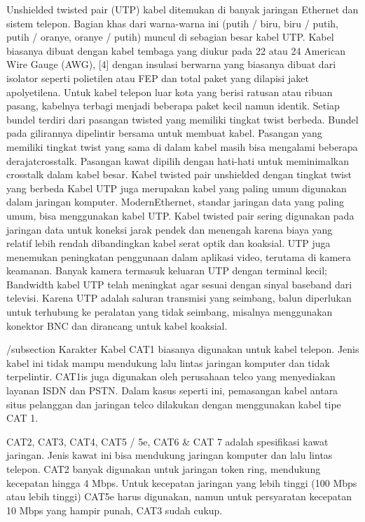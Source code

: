 Unshielded twisted pair (UTP) kabel ditemukan di banyak jaringan Ethernet dan sistem telepon. Bagian khas dari warna-warna ini (putih / biru, biru / putih, putih / oranye, oranye / putih) muncul di sebagian besar kabel UTP. Kabel biasanya dibuat dengan kabel tembaga yang diukur pada 22 atau 24 American Wire Gauge (AWG), [4] dengan insulasi berwarna yang biasanya dibuat dari isolator seperti polietilen atau FEP dan total paket yang dilapisi jaket apolyetilena. Untuk kabel telepon luar kota yang berisi ratusan atau ribuan pasang, kabelnya terbagi menjadi beberapa paket kecil namun identik. Setiap bundel terdiri dari pasangan twisted yang memiliki tingkat twist berbeda. Bundel pada gilirannya dipelintir bersama untuk membuat kabel. Pasangan yang memiliki tingkat twist yang sama di dalam kabel masih bisa mengalami beberapa derajatcrosstalk. Pasangan kawat dipilih dengan hati-hati untuk meminimalkan crosstalk dalam kabel besar. Kabel twisted pair unshielded dengan tingkat twist yang berbeda Kabel UTP juga merupakan kabel yang paling umum digunakan dalam jaringan komputer. ModernEthernet, standar jaringan data yang paling umum, bisa menggunakan kabel UTP. Kabel twisted pair sering digunakan pada jaringan data untuk koneksi jarak pendek dan menengah karena biaya yang relatif lebih rendah dibandingkan kabel serat optik dan koaksial. UTP juga menemukan peningkatan penggunaan dalam aplikasi video, terutama di kamera keamanan. Banyak kamera termasuk keluaran UTP dengan terminal kecil; Bandwidth kabel UTP telah meningkat agar sesuai dengan sinyal baseband dari televisi. Karena UTP adalah saluran transmisi yang seimbang, balun diperlukan untuk terhubung ke peralatan yang tidak seimbang, misalnya menggunakan konektor BNC dan dirancang untuk kabel koaksial.

/subsection {Karakter Kabel}
CAT1 biasanya digunakan untuk kabel telepon. Jenis kabel ini tidak mampu mendukung lalu lintas jaringan komputer dan tidak terpelintir. CAT1is juga digunakan oleh perusahaan telco yang menyediakan layanan ISDN dan PSTN. Dalam kasus seperti ini, pemasangan kabel antara situs pelanggan dan jaringan telco dilakukan dengan menggunakan kabel tipe CAT 1.

CAT2, CAT3, CAT4, CAT5 / 5e, CAT6 & CAT 7 adalah spesifikasi kawat jaringan. Jenis kawat ini bisa mendukung jaringan komputer dan lalu lintas telepon. CAT2 banyak digunakan untuk jaringan token ring, mendukung kecepatan hingga 4 Mbps. Untuk kecepatan jaringan yang lebih tinggi (100 Mbps atau lebih tinggi) CAT5e harus digunakan, namun untuk persyaratan kecepatan 10 Mbps yang hampir punah, CAT3 sudah cukup.

